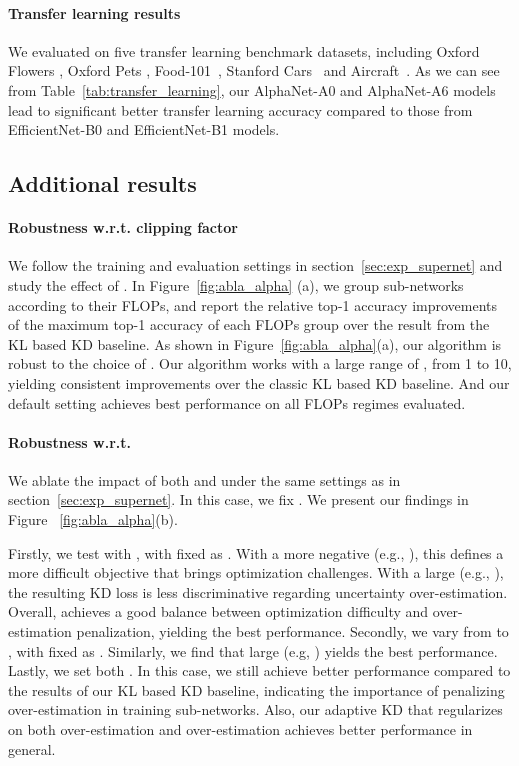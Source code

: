 \documentclass{article}
\begin{document}
    
\paragraph{Transfer learning results} 
We evaluated on five transfer learning benchmark datasets, including Oxford Flowers \citep{nilsback2008automated}, Oxford Pets \citep{parkhi2012cats}, Food-101~\citep{bossard2014food}, Stanford Cars~\citep{krause2013collecting} and Aircraft~\citep{maji2013fine}.
As we can see from Table~\ref{tab:transfer_learning}, 
our AlphaNet-A0 and  AlphaNet-A6 models lead to significant better transfer learning accuracy compared to those from EfficientNet-B0 and EfficientNet-B1 models. 


\subsection{Additional results}
\label{sec:exp_ablation}


\paragraph{Robustness w.r.t. clipping factor }
We follow the training and evaluation settings in section~\ref{sec:exp_supernet} and study the effect of .
In Figure~\ref{fig:abla_alpha} (a), we group sub-networks according to their FLOPs, and report the relative top-1 accuracy improvements of the maximum top-1 accuracy of each FLOPs group over the result from the KL based KD baseline.   
As shown in Figure~\ref{fig:abla_alpha}(a),  our algorithm is robust to the choice of . Our algorithm works with a large range of , from 1 to 10, yielding consistent improvements over the classic KL based KD baseline. 
And our default setting  achieves best performance on all FLOPs regimes evaluated.

\paragraph{Robustness w.r.t. }
We ablate the impact of both  and  under the same settings as in section~\ref{sec:exp_supernet}.
In this case,  we fix .
We present our findings in Figure~ \ref{fig:abla_alpha}(b). 

Firstly,  we test with , with  fixed as . 
With a more negative  (e.g., ), this defines a more difficult objective that brings optimization challenges. With a large  (e.g., ), the resulting KD loss is less discriminative regarding {uncertainty over-estimation}. Overall,  achieves a good balance between optimization difficulty and over-estimation penalization, yielding the best performance.
Secondly, we vary  from  to , with  fixed as . 
Similarly, we find that large  (e.g, ) yields the best performance.
Lastly, we set both . In this case, 
we still achieve better performance compared to the results of our KL based KD baseline, indicating the importance of penalizing over-estimation in training sub-networks. 
Also, our adaptive KD that regularizes on both over-estimation and over-estimation achieves better performance in general. 
\end{document}
